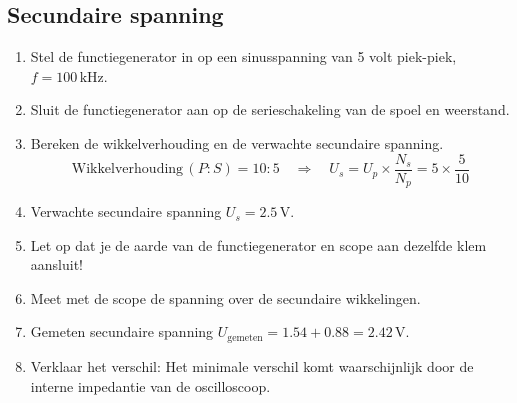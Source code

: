 \subsection{Secundaire spanning}
\begin{enumerate}
    \item Stel de functiegenerator in op een sinusspanning van 5 volt piek-piek, \( f = 100 \, \text{kHz} \).
    \item Sluit de functiegenerator aan op de serieschakeling van de spoel en weerstand.
    \item Bereken de wikkelverhouding en de verwachte secundaire spanning.
    \[
    \text{Wikkelverhouding} \, (P:S) = 10:5 \quad \Rightarrow \quad U_s = U_p \times \frac{N_s}{N_p} = 5 \times \frac{5}{10}
    \]
    \item Verwachte secundaire spanning \( U_s = 2.5 \, \text{V} \).
    \item Let op dat je de aarde van de functiegenerator en scope aan dezelfde klem aansluit!
    \item Meet met de scope de spanning over de secundaire wikkelingen.
    \item Gemeten secundaire spanning \( U_{\text{gemeten}} = 1.54 + 0.88 = 2.42 \, \text{V} \).
    \item Verklaar het verschil: Het minimale verschil komt waarschijnlijk door de interne impedantie van de oscilloscoop.
\end{enumerate}
